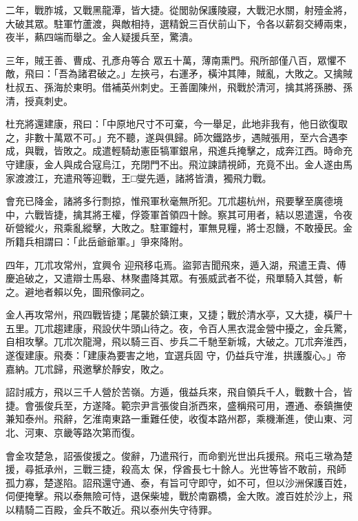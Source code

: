 \begin{pinyinscope}
 二年，戰胙城，又戰黑龍潭，皆大捷。從閭勍保護陵寢，大戰汜水關，射殪金將，大破其眾。駐軍竹蘆渡，與敵相持，選精銳三百伏前山下，令各以薪芻交縛兩束，夜半，爇四端而舉之。金人疑援兵至，驚潰。



 三年，賊王善、曹成、孔彥舟等合
 眾五十萬，薄南熏門。飛所部僅八百，眾懼不敵，飛曰：「吾為諸君破之。」左挾弓，右運矛，橫沖其陣，賊亂，大敗之。又擒賊杜叔五、孫海於東明。借補英州刺史。王善圍陳州，飛戰於清河，擒其將孫勝、孫清，授真刺史。



 杜充將還建康，飛曰：「中原地尺寸不可棄，今一舉足，此地非我有，他日欲復取之，非數十萬眾不可。」充不聽，遂與俱歸。師次鐵路步，遇賊張用，至六合遇李成，與戰，皆敗之。成遣輕騎劫憲臣犒軍銀帛，飛進兵掩擊之，成奔江西。時命充
 守建康，金人與成合寇烏江，充閉門不出。飛泣諫請視師，充竟不出。金人遂由馬家渡渡江，充遣飛等迎戰，王□燮先遁，諸將皆潰，獨飛力戰。



 會充已降金，諸將多行剽掠，惟飛軍秋毫無所犯。兀朮趨杭州，飛要擊至廣德境中，六戰皆捷，擒其將王權，俘簽軍首領四十餘。察其可用者，結以恩遣還，令夜斫營縱火，飛乘亂縱擊，大敗之。駐軍鐘村，軍無見糧，將士忍饑，不敢擾民。金所籍兵相謂曰：「此岳爺爺軍。」爭來降附。



 四年，兀朮攻常州，宜興令
 迎飛移屯焉。盜郭吉聞飛來，遁入湖，飛遣王貴、傅慶追破之，又遣辯士馬皋、林聚盡降其眾。有張威武者不從，飛單騎入其營，斬之。避地者賴以免，圖飛像祠之。



 金人再攻常州，飛四戰皆捷；尾襲於鎮江東，又捷；戰於清水亭，又大捷，橫尸十五里。兀朮趨建康，飛設伏牛頭山待之。夜，令百人黑衣混金營中擾之，金兵驚，自相攻擊。兀朮次龍灣，飛以騎三百、步兵二千馳至新城，大破之。兀朮奔淮西，遂復建康。飛奏：「建康為要害之地，宜選兵固
 守，仍益兵守淮，拱護腹心。」帝嘉納。兀朮歸，飛邀擊於靜安，敗之。



 詔討戚方，飛以三千人營於苦嶺。方遁，俄益兵來，飛自領兵千人，戰數十合，皆捷。會張俊兵至，方遂降。範宗尹言張俊自浙西來，盛稱飛可用，遷通、泰鎮撫使兼知泰州。飛辭，乞淮南東路一重難任使，收復本路州郡，乘機漸進，使山東、河北、河東、京畿等路次第而復。



 會金攻楚急，詔張俊援之。俊辭，乃遣飛行，而命劉光世出兵援飛。飛屯三墩為楚援，尋抵承州，三戰三捷，殺高太
 保，俘酋長七十餘人。光世等皆不敢前，飛師孤力寡，楚遂陷。詔飛還守通、泰，有旨可守即守，如不可，但以沙洲保護百姓，伺便掩擊。飛以泰無險可恃，退保柴墟，戰於南霸橋，金大敗。渡百姓於沙上，飛以精騎二百殿，金兵不敢近。飛以泰州失守待罪。




\end{pinyinscope}

